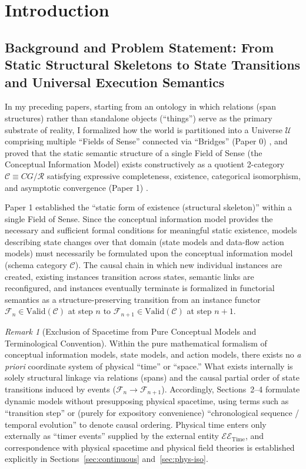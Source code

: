 \documentclass[11pt,a4paper]{article}
\theoremstyle{definition}
\theoremstyle{plain}
\theoremstyle{remark}
\newtheorem{remark}{Remark}[section]
\newcommand{\Valid}{\mathrm{Valid}}
\begin{document}
\section{Introduction}

\subsection{Background and Problem Statement: From Static Structural Skeletons to State Transitions and Universal Execution Semantics}
In my preceding papers, starting from an ontology in which relations (span structures) rather than standalone objects (``things'') serve as the primary substrate of reality, I formalized how the world is partitioned into a Universe $\mathcal{U}$ comprising multiple ``Fields of Sense'' \cite{gabriel2015} connected via ``Bridges'' (Paper 0) \cite{ota2026paper0}, and proved that the static semantic structure of a single Field of Sense (the Conceptual Information Model) exists constructively as a quotient 2-category $\mathcal{C} \equiv CG/\mathcal{R}$ satisfying expressive completeness, existence, categorical isomorphism, and asymptotic convergence (Paper 1) \cite{ota2026paper1}.

Paper 1 established the ``static form of existence (structural skeleton)'' within a single Field of Sense. Since the conceptual information model provides the necessary and sufficient formal conditions for meaningful static existence, models describing state changes over that domain (state models and data-flow action models) must necessarily be formulated upon the conceptual information model (schema category $\mathcal{C}$). The causal chain in which new individual instances are created, existing instances transition across states, semantic links are reconfigured, and instances eventually terminate is formalized in functorial semantics \cite{lawvere1963,maclane1998} as a structure-preserving transition from an instance functor $\mathcal{F}_n \in \Valid(\mathcal{C})$ at step $n$ to $\mathcal{F}_{n+1} \in \Valid(\mathcal{C})$ at step $n+1$.

\begin{remark}[Exclusion of Spacetime from Pure Conceptual Models and Terminological Convention]\label{rem:no-spacetime}
Within the pure mathematical formalism of conceptual information models, state models, and action models, there exists no \emph{a priori} coordinate system of physical ``time'' or ``space.'' What exists internally is solely structural linkage via relations (spans) and the causal partial order of state transitions induced by events ($\mathcal{F}_n \to \mathcal{F}_{n+1}$). Accordingly, Sections~2--4 formulate dynamic models without presupposing physical spacetime, using terms such as ``transition step'' or (purely for expository convenience) ``chronological sequence / temporal evolution'' to denote causal ordering. Physical time enters only externally as ``timer events'' supplied by the external entity $\mathcal{EE}_{\mathrm{Time}}$, and correspondence with physical spacetime and physical field theories is established explicitly in Sections~\ref{sec:continuous} and~\ref{sec:phys-iso}.
\end{remark}
\end{document}
